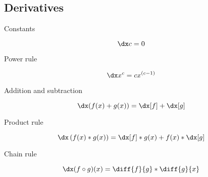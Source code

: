 \subsection{Derivatives}

\begin{psec}{Constants}

    \begin{equation}\label{eq:derivative constant}
        \dx c = 0
    \end{equation}

\end{psec}

\begin{psec}{Power rule}

    \begin{equation}\label{eq:derivative power}
        \dx x^c = c x^{(c - 1)}
    \end{equation}

\end{psec}

\begin{psec}{Addition and subtraction}

    \begin{equation}\label{eq:derivative add}
        \dx (f(x) + g(x)) = \dx[f] + \dx[g]
    \end{equation}

\end{psec}

\begin{psec}{Product rule}

    \begin{equation}\label{eq:derivative prod}
        \dx \left(f(x)*g(x)\right) = \dx[f] *  g(x) + f(x) *
        \dx[g] 
    \end{equation}

\end{psec}

\begin{psec}{Chain rule}

    \begin{equation}\label{eq:derivative chain}
        \dx (f \circ g)(x) = \diff{f}{g} * \diff{g}{x}
    \end{equation}

\end{psec}

